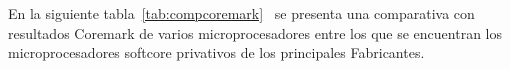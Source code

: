 % 

En la siguiente tabla~\ref{tab:compcoremark}~\cite{compcoremark} se presenta una comparativa con resultados Coremark de varios microprocesadores entre los que se
encuentran los microprocesadores softcore privativos de los principales Fabricantes.


